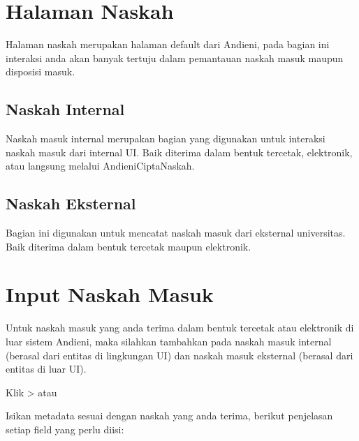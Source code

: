 \documentclass[letterpaper,10pt,bahasai]{sphinxmanual}
\begin{document}
\section{Halaman Naskah}
\label{\detokenize{agendaSurat:halaman-naskah}}
Halaman naskah merupakan halaman default dari Andieni, pada bagian ini interaksi anda akan banyak tertuju dalam pemantauan
naskah masuk maupun disposisi masuk.


\subsection{Naskah Internal}
\label{\detokenize{agendaSurat:naskah-internal}}
Naskah masuk internal merupakan bagian yang digunakan untuk interaksi naskah masuk dari internal UI. Baik diterima dalam bentuk tercetak, elektronik, atau langsung melalui Andieni\sphinxhyphen{}CiptaNaskah.

\noindent{}


\subsection{Naskah Eksternal}
\label{\detokenize{agendaSurat:naskah-eksternal}}
Bagian ini digunakan untuk mencatat naskah masuk dari eksternal universitas. Baik diterima dalam bentuk tercetak maupun elektronik.

\noindent{}


\section{Input Naskah Masuk}
\label{\detokenize{agendaSurat:input-naskah-masuk}}
Untuk naskah masuk yang anda terima dalam bentuk tercetak atau elektronik di luar sistem Andieni, maka silahkan tambahkan
pada naskah masuk internal (berasal dari entitas di lingkungan UI) dan naskah masuk eksternal (berasal dari entitas di
luar UI).

Klik \sphinxhyphen{}\textgreater{}  atau 

\noindent{}

\noindent{}

Isikan metadata sesuai dengan naskah yang anda terima, berikut penjelasan setiap field yang perlu diisi:
\end{document}
